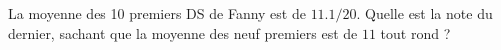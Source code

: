 
\begin{exercice}\label{exosmath-0250}

    La moyenne des 10 premiers DS de Fanny est de \( 11.1/20\). Quelle est la note du dernier, sachant que la moyenne des neuf premiers est de \( 11\) tout rond ?

\end{exercice}
